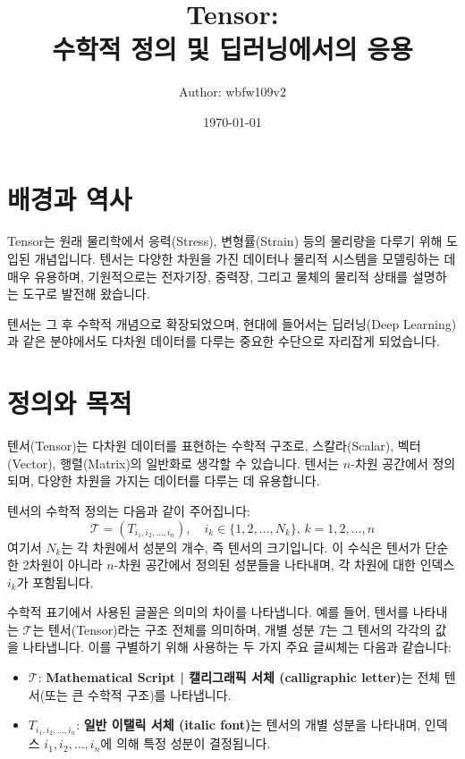\documentclass[12pt]{article}
\title{
    Tensor: \\
    수학적 정의 및 딥러닝에서의 응용
}
\author{Author: wbfw109v2}
\date{\today}
\begin{document}
\maketitle
\tableofcontents

\section{배경과 역사}

\noindent Tensor는 원래 물리학에서 응력(Stress), 변형률(Strain) 등의 물리량을 다루기 위해 도입된 개념입니다. 텐서는 다양한 차원을 가진 데이터나 물리적 시스템을 모델링하는 데 매우 유용하며, 기원적으로는 전자기장, 중력장, 그리고 물체의 물리적 상태를 설명하는 도구로 발전해 왔습니다.

\vspace{1\baselineskip}
\noindent 텐서는 그 후 수학적 개념으로 확장되었으며, 현대에 들어서는 딥러닝(Deep Learning)과 같은 분야에서도 다차원 데이터를 다루는 중요한 수단으로 자리잡게 되었습니다.

\section{정의와 목적}

\noindent 텐서(Tensor)는 다차원 데이터를 표현하는 수학적 구조로, 스칼라(Scalar), 벡터(Vector), 행렬(Matrix)의 일반화로 생각할 수 있습니다. 텐서는 \( n \)-차원 공간에서 정의되며, 다양한 차원을 가지는 데이터를 다루는 데 유용합니다.

\noindent 텐서의 수학적 정의는 다음과 같이 주어집니다:
\[
  \mathcal{T} = (T_{i_1, i_2, \dots, i_n}), \quad i_k \in \{1, 2, \dots, N_k\}, \, k = 1, 2, \dots, n
\]
여기서 \( N_k \)는 각 차원에서 성분의 개수, 즉 텐서의 크기입니다. 이 수식은 텐서가 단순한 2차원이 아니라 \( n \)-차원 공간에서 정의된 성분들을 나타내며, 각 차원에 대한 인덱스 \( i_k \)가 포함됩니다.

\noindent 수학적 표기에서 사용된 글꼴은 의미의 차이를 나타냅니다. 예를 들어, 텐서를 나타내는 \( \mathcal{T} \)는 텐서(Tensor)라는 구조 전체를 의미하며, 개별 성분 \( T \)는 그 텐서의 각각의 값을 나타냅니다. 이를 구별하기 위해 사용하는 두 가지 주요 글씨체는 다음과 같습니다:

\begin{itemize}
  \item \( \mathcal{T} \): \textbf{Mathematical Script | 캘리그래픽 서체 (calligraphic letter)}는 전체 텐서(또는 큰 수학적 구조)를 나타냅니다.
  \item \( T_{i_1, i_2, \dots, i_n} \): \textbf{일반 이탤릭 서체 (italic font)}는 텐서의 개별 성분을 나타내며, 인덱스 \( i_1, i_2, \dots, i_n \)에 의해 특정 성분이 결정됩니다.
\end{itemize}
\end{document}
